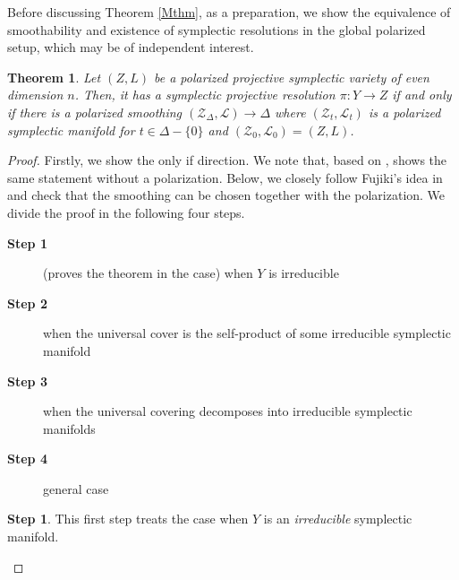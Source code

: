 \documentclass[12pt,a4paper]{amsart}
\newtheorem{Thm}{Theorem}[section]
\theoremstyle{remark}
\theoremstyle{definition}
\newtheorem{Step}{Step}
\begin{document}
Before discussing Theorem \ref{Mthm}, as a preparation, 
we show the equivalence of 
smoothability and existence of 
symplectic resolutions in the 
global polarized setup, 
which may be of independent interest. 

\begin{Thm}\label{smoothing}
Let $(Z, L)$ be a polarized projective symplectic variety of even dimension $n$. Then, it has 
a symplectic projective resolution $\pi\colon Y \to Z$ if and only if 
there is a polarized smoothing
$(\mathcal{Z}_{\Delta}, \mathcal{L}) \to \Delta$ where $(\mathcal{Z}_t, \mathcal{L}_t)$ is a polarized symplectic manifold for $t \in \Delta - \{0\}$ and $(\mathcal{Z}_0, \mathcal{L}_0) = (Z, L)$.  
\end{Thm}

\begin{proof}
Firstly, we show the only if direction. 
We note that, based on \cite[Theorem 4.8]{Fujiki},  
\cite[Theorem (2.2), Claim 3]{Nam.def0} shows the same statement without a polarization. 
Below, we closely follow Fujiki's idea in 
\cite[Theorem 4.8]{Fujiki} and 
check that the smoothing can be chosen together with the 
polarization. 
We divide the proof in the following four steps. 

\begin{description}
\item [{\bf Step 1}] (proves the theorem in the case) when $Y$ is irreducible 
\item [{\bf Step 2}] when the  universal cover is the self-product of 
some irreducible symplectic manifold 
\item [{\bf Step 3}] when the universal covering decomposes into irreducible symplectic manifolds
\item [{\bf Step 4}] general case
\end{description}


\begin{Step}\label{s1} %
This first step treats 
 the case when $Y$ is an {\it irreducible} symplectic manifold.
\vspace{0.2cm}


\end{Step}
\end{proof}
\end{document}
